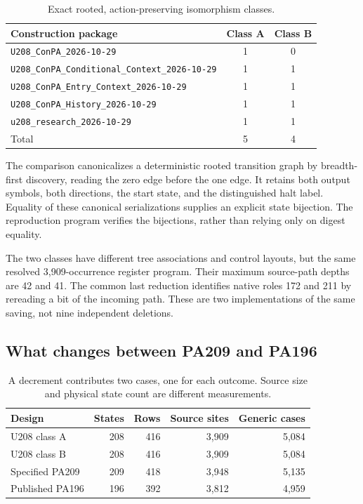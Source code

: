 \documentclass[11pt,letterpaper]{article}
\newcommand{\file}[1]{\texttt{\nolinkurl{#1}}}
\begin{document}
\begin{table}[ht]
\centering\small
\begin{tabular}{@{}p{.69\linewidth}cc@{}}
\toprule
Construction package & Class A & Class B\\
\midrule
\file{U208_ConPA_2026-10-29} & 1 & 0\\
\file{U208_ConPA_Conditional_Context_2026-10-29} & 1 & 1\\
\file{U208_ConPA_Entry_Context_2026-10-29} & 1 & 1\\
\file{U208_ConPA_History_2026-10-29} & 1 & 1\\
\file{u208_research_2026-10-29} & 1 & 1\\
\midrule
Total & 5 & 4\\
\bottomrule
\end{tabular}
\caption{Exact rooted, action-preserving isomorphism classes.}
\end{table}

The comparison canonicalizes a deterministic rooted transition graph by
breadth-first discovery, reading the zero edge before the one edge.
It retains both output symbols, both directions, the start state, and
the distinguished halt label. Equality of these canonical serializations
supplies an explicit state bijection. The reproduction program verifies
the bijections, rather than relying only on digest equality.

The two classes have different tree associations and control layouts,
but the same resolved 3,909-occurrence register program. Their maximum
source-path depths are 42 and 41. The common last reduction identifies
native roles 172 and 211 by rereading a bit of the incoming path.
These are two implementations of the same saving, not nine independent
deletions.

\subsection{What changes between PA209 and PA196}

\begin{table}[ht]
\centering
\begin{tabular}{@{}lrrrr@{}}
\toprule
Design & States & Rows & Source sites & Generic cases\\
\midrule
U208 class A & 208 & 416 & 3,909 & 5,084\\
U208 class B & 208 & 416 & 3,909 & 5,084\\
Specified PA209 & 209 & 418 & 3,948 & 5,135\\
Published PA196 & 196 & 392 & 3,812 & 4,959\\
\bottomrule
\end{tabular}
\caption{A decrement contributes two cases, one for each outcome.
Source size and physical state count are different measurements.}
\end{table}
\end{document}
